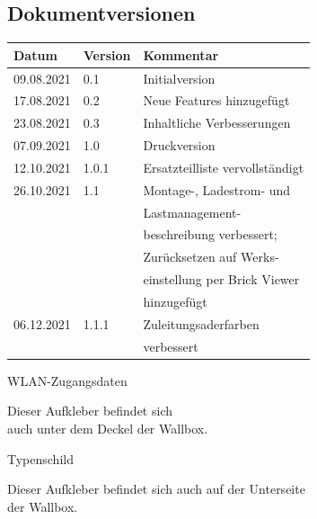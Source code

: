 \documentclass[a4paper,10pt]{article}
\begin{document}
\begin{multicols*}{2}
	\section{Dokumentversionen}
	\begin{tabular}{lll}
		\toprule
		Datum      & Version & Kommentar                       \\
		\midrule
		09.08.2021 & 0.1     & Initialversion                  \\
		17.08.2021 & 0.2     & Neue Features hinzugefügt       \\
		23.08.2021 & 0.3     & Inhaltliche Verbesserungen      \\
		07.09.2021 & 1.0     & Druckversion                    \\
		12.10.2021 & 1.0.1   & Ersatzteilliste vervollständigt \\
		26.10.2021 & 1.1     & Montage-, Ladestrom- und        \\
		           &         & Lastmanagement-                 \\
		           &         & beschreibung verbessert;        \\
		           &         & Zurücksetzen auf Werks-         \\
		           &         & einstellung per Brick Viewer    \\
		           &         & hinzugefügt                     \\
		06.12.2021 & 1.1.1   & Zuleitungsaderfarben            \\
		           &         & verbessert                      \\
		\bottomrule
	\end{tabular}
	\newpage
	\pagestyle{empty}
	\null
	\newpage
	\null
	\vfill
	WLAN-Zugangsdaten
	\begin{tcolorbox}[width=4.2cm,height=2.7cm, boxrule=0.25mm]

	\end{tcolorbox}
	Dieser Aufkleber befindet sich\\ auch unter dem Deckel der Wallbox.
	\columnbreak

	\null
	\vfill
	Typenschild
	\begin{tcolorbox}[width=7.8cm,height=4.1cm, boxrule=0.25mm]

	\end{tcolorbox}
	Dieser Aufkleber befindet sich auch auf der Unterseite\\ der Wallbox.
\end{multicols*}
\end{document}
